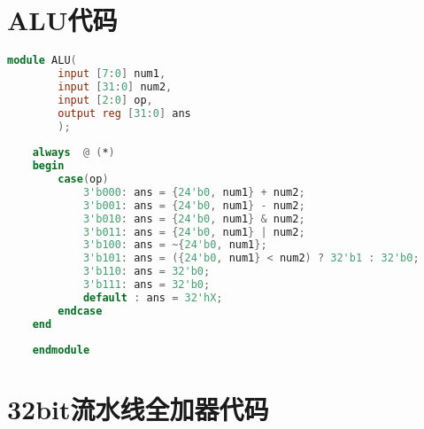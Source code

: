 \appendix
\section{ALU代码}

\begin{lstlisting}[language=Verilog]
    module ALU(
        input [7:0] num1,
        input [31:0] num2,
        input [2:0] op,
        output reg [31:0] ans
        );
    
    always  @ (*) 
    begin
        case(op)
            3'b000: ans = {24'b0, num1} + num2;
            3'b001: ans = {24'b0, num1} - num2;
            3'b010: ans = {24'b0, num1} & num2;
            3'b011: ans = {24'b0, num1} | num2;
            3'b100: ans = ~{24'b0, num1};
            3'b101: ans = ({24'b0, num1} < num2) ? 32'b1 : 32'b0;
            3'b110: ans = 32'b0;
            3'b111: ans = 32'b0;
            default : ans = 32'hX;
        endcase
    end
    
    endmodule
\end{lstlisting}

\section{32bit流水线全加器代码}

